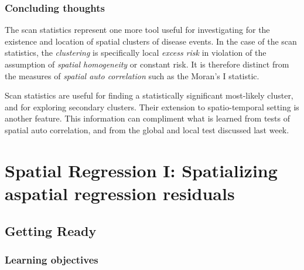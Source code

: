 \documentclass[
]{book}
\begin{document}
\hypertarget{concluding-thoughts}{%
\subsection{Concluding thoughts}\label{concluding-thoughts}}

The scan statistics represent one more tool useful for investigating for the existence and location of spatial clusters of disease events. In the case of the scan statistics, the \emph{clustering} is specifically local \emph{excess risk} in violation of the assumption of \emph{spatial homogeneity} or constant risk. It is therefore distinct from the measures of \emph{spatial auto correlation} such as the Moran's I statistic.

Scan statistics are useful for finding a statistically significant most-likely cluster, and for exploring secondary clusters. Their extension to spatio-temporal setting is another feature. This information can compliment what is learned from tests of spatial auto correlation, and from the global and local test discussed last week.

\hypertarget{spatreg1}{%
\chapter{Spatial Regression I: Spatializing aspatial regression residuals}\label{spatreg1}}

\hypertarget{getting-ready-8}{%
\section{Getting Ready}\label{getting-ready-8}}

\hypertarget{learning-objectives-9}{%
\subsection{Learning objectives}\label{learning-objectives-9}}

 
  \providecommand{\huxb}[2]{\arrayrulecolor[RGB]{#1}\global\arrayrulewidth=#2pt}
  \providecommand{\huxvb}[2]{\color[RGB]{#1}\vrule width #2pt}
  \providecommand{\huxtpad}[1]{\rule{0pt}{#1}}
  \providecommand{\huxbpad}[1]{\rule[-#1]{0pt}{#1}}
\end{document}
